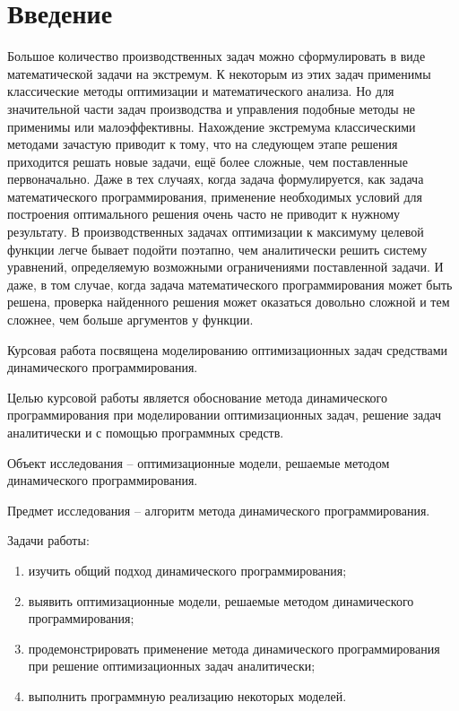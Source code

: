 \section*{Введение}

\indent Большое количество производственных задач можно сформулировать в виде математической задачи на экстремум. К некоторым из этих задач применимы классические методы оптимизации и математического анализа. Но для значительной части задач производства и управления подобные методы не применимы или малоэффективны. Нахождение экстремума классическими методами зачастую приводит к тому, что на следующем этапе решения приходится решать новые задачи, ещё более сложные, чем поставленные первоначально. Даже в тех случаях, когда задача формулируется, как задача математического программирования, применение необходимых условий для построения оптимального решения очень часто не приводит к нужному результату. В производственных задачах оптимизации к максимуму целевой функции легче бывает подойти поэтапно, чем аналитически решить систему уравнений, определяемую возможными ограничениями поставленной задачи. И даже, в том случае, когда задача математического программирования может быть решена, проверка найденного решения может оказаться довольно сложной и тем сложнее, чем больше аргументов у функции.

Курсовая работа посвящена моделированию оптимизационных задач средствами динамического программирования.

Целью курсовой работы является обоснование метода динамического программирования при моделировании оптимизационных задач, решение задач аналитически и с помощью программных средств.

Объект исследования -- оптимизационные модели, решаемые методом динамического программирования.

Предмет исследования -- алгоритм метода динамического программирования.

\newpage

Задачи работы:
\begin{enumerate}[wide]
    \item изучить общий подход динамического программирования;
    \item выявить оптимизационные модели, решаемые методом динамического программирования;
    \item продемонстрировать применение метода динамического программирования при решение оптимизационных задач аналитически;
    \item выполнить программную реализацию некоторых моделей.
\end{enumerate}

